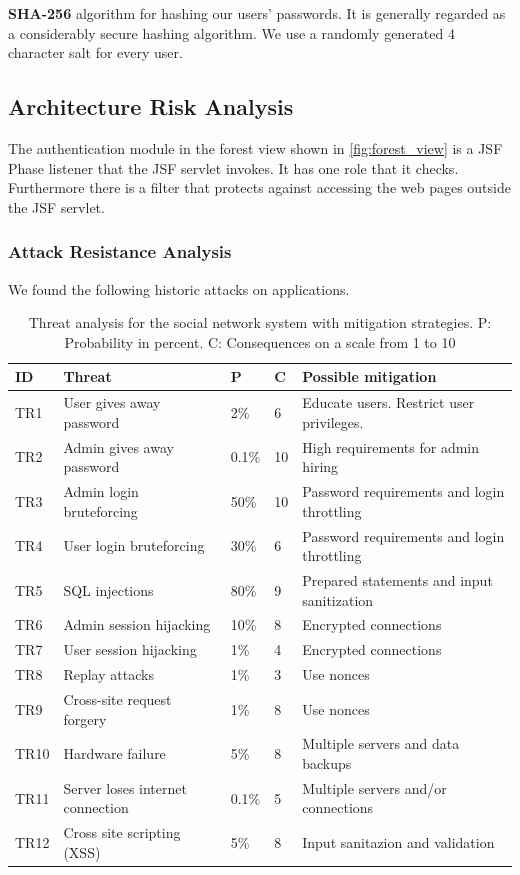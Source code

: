 \documentclass[a4paper]{article}
\begin{document}
\textbf{SHA-256} algorithm for hashing our users' passwords. It is generally regarded as a considerably secure hashing algorithm.
We use a randomly generated 4 character salt for every user.


\subsection{Architecture Risk Analysis}
The authentication module in the forest view shown in \ref{fig:forest_view} is a JSF Phase listener that the JSF servlet invokes. It has one role that it checks.
Furthermore there is a filter that protects against accessing the web pages outside the JSF servlet.


\subsubsection{Attack Resistance Analysis}
We found the following historic attacks on applications.

\begin{table}[h!]
	\begin{tabular}{| l | p{4cm} | l | l | p{5cm} |}
		\hline
		\textbf{ID} & \textbf{Threat} & \textbf{P} & \textbf{C} & \textbf{Possible mitigation} \\ \hline
		TR1 & User gives away password & 2\% & 6 & Educate users. Restrict user privileges. \\ \hline
        TR2 & Admin gives away password & 0.1\%  & 10 & High requirements for admin hiring \\ \hline
        TR3 & Admin login bruteforcing & 50\% & 10 & Password requirements and login throttling \\ \hline
        TR4 & User login bruteforcing & 30\% & 6 & Password requirements and login throttling \\ \hline
        TR5 & SQL injections & 80\% & 9 & Prepared statements and input sanitization \\ \hline
        TR6 & Admin session hijacking & 10\% & 8 & Encrypted connections \\ \hline
        TR7 & User session hijacking & 1\% & 4 & Encrypted connections \\ \hline
        TR8 & Replay attacks & 1\% & 3 & Use nonces \\ \hline
       	TR9 & Cross-site request forgery & 1\% & 8 & Use nonces \\ \hline
        TR10 & Hardware failure & 5\% & 8 & Multiple servers and data backups \\ \hline
        TR11 & Server loses internet connection & 0.1\% & 5 & Multiple servers and/or connections \\ \hline
        TR12 & Cross site scripting (XSS) & 5\% & 8 & Input sanitazion and validation \\ \hline
	\end{tabular}
	\caption{Threat analysis for the social network system with mitigation strategies. P: Probability in percent. C: Consequences on a scale from 1 to 10}
		\label{tab:threats}
\end{table}
\end{document}
